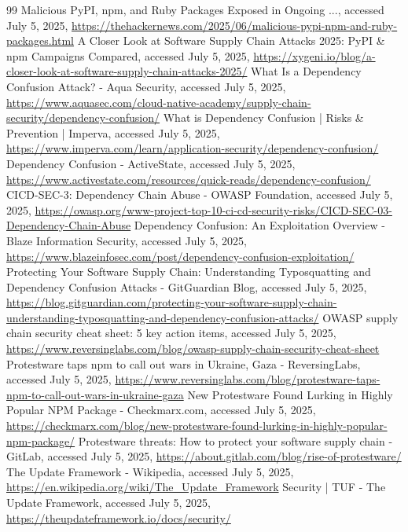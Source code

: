 \documentclass{article}
\begin{document}
\begin{thebibliography}{99}
Malicious PyPI, npm, and Ruby Packages Exposed in Ongoing ..., accessed July 5, 2025, \url{https://thehackernews.com/2025/06/malicious-pypi-npm-and-ruby-packages.html}
A Closer Look at Software Supply Chain Attacks 2025: PyPI \& npm Campaigns Compared, accessed July 5, 2025, \url{https://xygeni.io/blog/a-closer-look-at-software-supply-chain-attacks-2025/}
What Is a Dependency Confusion Attack? - Aqua Security, accessed July 5, 2025, \url{https://www.aquasec.com/cloud-native-academy/supply-chain-security/dependency-confusion/}
What is Dependency Confusion | Risks \& Prevention | Imperva, accessed July 5, 2025, \url{https://www.imperva.com/learn/application-security/dependency-confusion/}
Dependency Confusion - ActiveState, accessed July 5, 2025, \url{https://www.activestate.com/resources/quick-reads/dependency-confusion/}
CICD-SEC-3: Dependency Chain Abuse - OWASP Foundation, accessed July 5, 2025, \url{https://owasp.org/www-project-top-10-ci-cd-security-risks/CICD-SEC-03-Dependency-Chain-Abuse}
Dependency Confusion: An Exploitation Overview - Blaze Information Security, accessed July 5, 2025, \url{https://www.blazeinfosec.com/post/dependency-confusion-exploitation/}
Protecting Your Software Supply Chain: Understanding Typosquatting and Dependency Confusion Attacks - GitGuardian Blog, accessed July 5, 2025, \url{https://blog.gitguardian.com/protecting-your-software-supply-chain-understanding-typosquatting-and-dependency-confusion-attacks/}
OWASP supply chain security cheat sheet: 5 key action items, accessed July 5, 2025, \url{https://www.reversinglabs.com/blog/owasp-supply-chain-security-cheat-sheet}
Protestware taps npm to call out wars in Ukraine, Gaza - ReversingLabs, accessed July 5, 2025, \url{https://www.reversinglabs.com/blog/protestware-taps-npm-to-call-out-wars-in-ukraine-gaza}
New Protestware Found Lurking in Highly Popular NPM Package - Checkmarx.com, accessed July 5, 2025, \url{https://checkmarx.com/blog/new-protestware-found-lurking-in-highly-popular-npm-package/}
Protestware threats: How to protect your software supply chain - GitLab, accessed July 5, 2025, \url{https://about.gitlab.com/blog/rise-of-protestware/}
The Update Framework - Wikipedia, accessed July 5, 2025, \url{https://en.wikipedia.org/wiki/The\_Update\_Framework}
Security | TUF - The Update Framework, accessed July 5, 2025, \url{https://theupdateframework.io/docs/security/}

\end{thebibliography}
\end{document}
